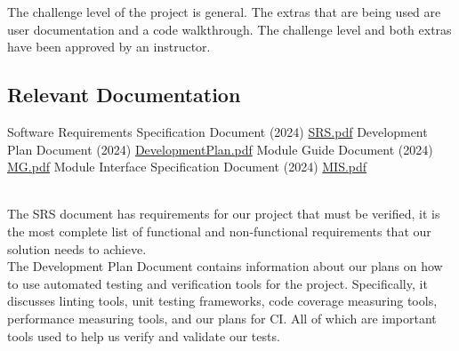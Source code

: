 \documentclass[12pt, titlepage]{article}
\begin{document}

The challenge level of the project is general. The extras that are being used
are user documentation and a code walkthrough. The challenge level and both extras
have been approved by an instructor.

\subsection{Relevant Documentation}


\begin{thebibliography}{9}
   Software Requirements Specification Document (2024)
  \href{../SRS-Volere/SRS.pdf}{SRS.pdf}
   Development Plan Document (2024)
  \href{../DevelopmentPlan/DevelopmentPlan.pdf}{DevelopmentPlan.pdf}
   Module Guide Document (2024)
  \href{../Design/SoftArchitecture/MG.pdf}{MG.pdf}
   Module Interface Specification Document (2024)
  \href{../Design/SoftDetailedDes/MIS.pdf}{MIS.pdf}
  \\
\end{thebibliography}

\\
The SRS document has requirements for our project that must be verified, it is
the most complete list of functional and non-functional requirements that our
solution needs to achieve.\\

The Development Plan Document contains information about our plans on how to use 
automated testing and verification tools for the project. Specifically, it discusses
linting tools, unit testing frameworks, code coverage measuring tools, performance
measuring tools, and our plans for CI. All of which are important tools used to 
help us verify and validate our tests.\\
\end{document}
